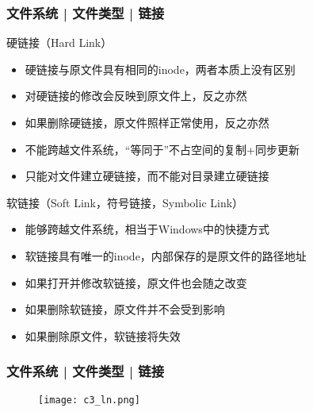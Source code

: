 \begin{frame}
  \frametitle{文件系统 | 文件类型 | \alert{链接}}
  \begin{block}{硬链接（Hard Link）}
    \begin{itemize}[<+->]
      \item 硬链接与原文件具有相同的inode，两者本质上没有区别
      \item 对硬链接的修改会反映到原文件上，反之亦然
      \item 如果删除硬链接，原文件照样正常使用，反之亦然
      \item 不能跨越文件系统，“等同于”不占空间的复制+同步更新
      \item 只能对文件建立硬链接，而不能对目录建立硬链接
    \end{itemize}
  \end{block}
  \pause
  \begin{block}{软链接（Soft Link，符号链接，Symbolic Link）}
    \begin{itemize}[<+->]
      \item 能够跨越文件系统，相当于Windows中的快捷方式
      \item 软链接具有唯一的inode，内部保存的是原文件的路径地址
      \item 如果打开并修改软链接，原文件也会随之改变
      \item 如果删除软链接，原文件并不会受到影响
      \item 如果删除原文件，软链接将失效
    \end{itemize}
  \end{block}
\end{frame}

\begin{frame}
  \frametitle{文件系统 | 文件类型 | 链接}
  \begin{figure}
    \centering
    \texttt{[image: c3\_ln.png]}
  \end{figure}
\end{frame}

